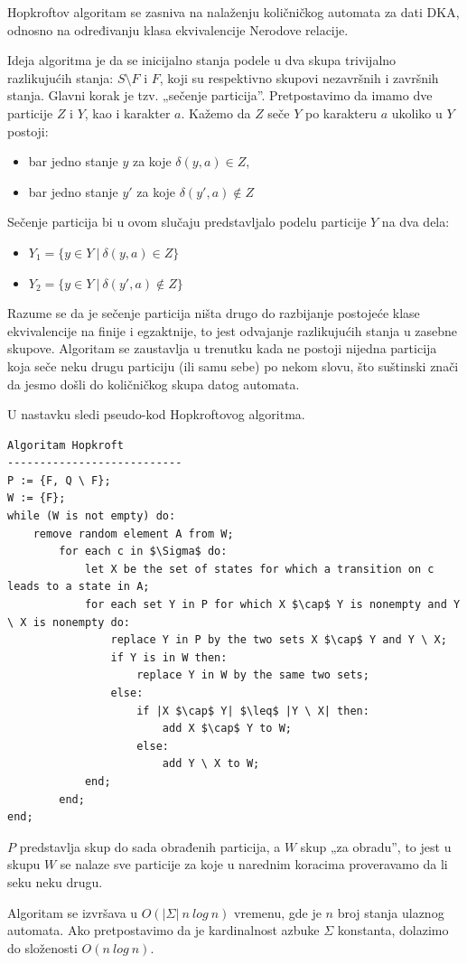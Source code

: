 \documentclass[a4paper]{article}
\begin{document}
Hopkroftov algoritam se zasniva na nalaženju količničkog automata za dati DKA, odnosno na određivanju klasa ekvivalencije Nerodove relacije. \par
Ideja algoritma je da se inicijalno stanja podele u dva skupa trivijalno razlikujućih stanja: $S \setminus F$ i $F$, koji su respektivno skupovi nezavršnih i završnih stanja. Glavni korak je tzv. „sečenje particija”. Pretpostavimo da imamo dve particije $Z$ i $Y$, kao i karakter $a$. Kažemo da $Z$ seče $Y$ po karakteru $a$ ukoliko u $Y$ postoji: 
\begin{itemize}
\item bar jedno stanje $y$ za koje $\delta(y, a) \in Z$,
\item bar jedno stanje $y'$ za koje $\delta(y', a) \notin Z$
\end{itemize}
Sečenje particija bi u ovom slučaju predstavljalo podelu particije $Y$ na dva dela:
\begin{itemize}
\item $Y_{1} = \{ y \in Y \ | \ \delta(y, a) \in Z \}$ 
\item $Y_{2} = \{ y \in Y \ | \ \delta(y', a) \notin Z \}$ 
\end{itemize}
Razume se da je sečenje particija ništa drugo do razbijanje postojeće klase ekvivalencije na finije i egzaktnije, to jest odvajanje razlikujućih stanja u zasebne skupove. Algoritam se zaustavlja u trenutku kada ne postoji nijedna particija koja seče neku drugu particiju (ili samu sebe) po nekom slovu, što suštinski znači da jesmo došli do količničkog skupa datog automata. \par
U nastavku sledi pseudo-kod\cite{wiki} Hopkroftovog algoritma.

\vspace{10pt}

\begin{lstlisting}
Algoritam Hopkroft
---------------------------
P := {F, Q \ F};
W := {F};
while (W is not empty) do:
	remove random element A from W;
		for each c in $\Sigma$ do:
			let X be the set of states for which a transition on c leads to a state in A;
			for each set Y in P for which X $\cap$ Y is nonempty and Y \ X is nonempty do:
				replace Y in P by the two sets X $\cap$ Y and Y \ X;
				if Y is in W then:
					replace Y in W by the same two sets;
				else:
					if |X $\cap$ Y| $\leq$ |Y \ X| then:
						add X $\cap$ Y to W;
					else:
						add Y \ X to W;
			end;
		end;
end;
\end{lstlisting}

$P$ predstavlja skup do sada obrađenih particija, a $W$ skup „za obradu”, to jest u skupu $W$ se nalaze sve particije za koje u narednim koracima proveravamo da li seku neku drugu. \par
Algoritam se izvršava u $O(|\Sigma| \ n \ log \ n)$ vremenu, gde je $n$ broj stanja ulaznog automata. Ako pretpostavimo da je kardinalnost azbuke $\Sigma$ konstanta, dolazimo do složenosti $O(n \ log \ n)$.
\end{document}

